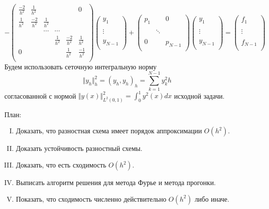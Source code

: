 \documentclass[12pt]{article}
\begin{document}
    \[
    -\left(\begin{array}{cccccc}
        \frac{-2}{h^2}& \frac{1}{h^2}  &&&& 0 \\
        \frac{1}{h^2} & \frac{-2}{h^2} & \frac{1}{h^2} &&& \\
        &&\cdots&\cdots&& \\
        &&& \frac{1}{h^2} & \frac{-2}{h^2} & \frac{1}{h^2} \\
        0 &&&               & \frac{1}{h^2}  & \frac{-1}{h^2} \\
    \end{array}\right)
    \left(\begin{array}{c}
        y_{1}\\
        \\
        \vdots\\
        \\
        y_{N-1}\\
    \end{array}\right)
    +
    \left(\begin{array}{ccc}
        p_1  && 0 \\
        && \\
        &\ddots& \\
        && \\
        0 && p_{N-1} \\
    \end{array}\right)
    \left(\begin{array}{c}
        y_{1}\\
        \\
        \vdots\\
        \\
        y_{N-1}\\
    \end{array}\right)
    =
    \left(\begin{array}{c}
        f_{1}\\
        \\
        \vdots\\
        \\
        f_{N-1}\\
    \end{array}\right)
    \]
    Будем использовать сеточную интегральную норму
    \[\Vert y_h\Vert^2_h = (y_h,y_h)_h= \sum_{k=1}^{N-1}y^2_kh\]
    согласованной с нормой $\Vert y(x)\Vert^2_{L^2(0,1)} = \int_0^1y^2(x)dx$ исходной задачи.

    План:
    \begin{enumerate}[I.]
        \item Доказать, что разностная схема имеет порядок аппроксимации $O(h^2)$.
        \item Доказать устойчивость разностный схемы.
        \item Доказать, что есть сходимость $O(h^2)$.
        \item Выписать алгоритм решения для метода Фурье и метода прогонки.
        \item Показать, что сходимость численно действительно $O(h^2)$ либо иначе.
    \end{enumerate}
\end{document}
